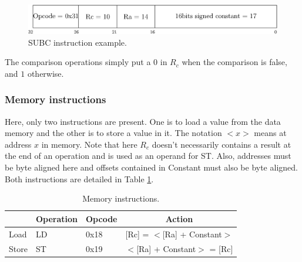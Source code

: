 \begin{figure}[H]
    \centering
    \includegraphics[scale=0.6]{Chapter3-CPU/res/instruction_subc}
    \caption{SUBC instruction example.}
    \label{fig:instructions/subc}
\end{figure}

The comparison operations simply put a $0$ in $R_c$ when the comparison is 
false, and $1$ otherwise.

\subsubsection*{Memory instructions}

Here, only two instructions are present. One is to load a value from the data memory and the other 
is to store a value in it. The notation $<x>$ means at address $x$ in memory. Note that here $R_c$
doesn't necessarily contains a result at the end of an operation and is used as an operand for ST.
Also, addresses must be byte aligned here and offsets contained in Constant must also be byte
aligned. Both instructions are detailed in Table \ref{tab:instruction/dm}.

\begin{table}[H]
    \centering
    \begin{tabular}{|l|l|l|l|}
    \hline
    \rowcolor[HTML]{DAE8FC} 
    \multicolumn{1}{|c|}{\cellcolor[HTML]{DAE8FC}\textbf{Name}} & \multicolumn{1}{c|}{\cellcolor[HTML]{DAE8FC}\textbf{Operation}} & \multicolumn{1}{c|}{\cellcolor[HTML]{DAE8FC}\textbf{Opcode}} & \multicolumn{1}{c|}{\cellcolor[HTML]{DAE8FC}\textbf{Action}} \\ \hline
    Load                                                        & LD                                                              & 0x18                                                         & {[}Rc{]} = $<${[}Ra{]} + Constant$>$      \\ \hline
    Store                                                       & ST                                                              & 0x19                                                         & $<${[}Ra{]} + Constant$>$ = {[}Rc{]}        \\ \hline
    \end{tabular}
    \caption{Memory instructions.}
    \label{tab:instruction/dm}
\end{table}

